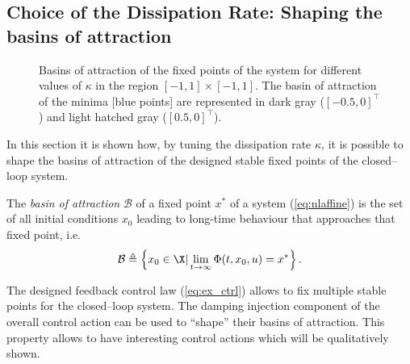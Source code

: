 \subsection{Choice of the Dissipation Rate: Shaping the basins of attraction}
%
\begin{figure*}[h]
	\centering
	\vspace{-9mm}
	\caption{\footnotesize Basins of attraction of the fixed points of the system for different values of $\kappa$ in the region $[-1,1]\times [-1,1]$. The basin of attraction of the minima [blue points] are represented in dark gray ($[-0.5,0]^\top$) and light hatched gray ($[0.5,0]^\top$).}
	\label{fig:basin}
\end{figure*}
%
In this section it is shown how, by tuning the dissipation rate $\kappa$, it is possible to shape the basins of attraction of the designed stable fixed points of the closed--loop system.
%
\begin{defn}
The \textit{basin of attraction} $\mathcal{B}$ of a fixed point $x^*$ of a system (\ref{eq:nlaffine}) is the set of all initial conditions $x_0$ leading to long-time behaviour that approaches that fixed point, i.e.
\begin{equation*}
    \mathcal{B} \triangleq \left\{x_0\in\X|\lim \limits_{t\rightarrow\infty}\Phi(t,x_0,u)=x^*\right\}.
\end{equation*}
\end{defn}
%
The designed feedback control law (\ref{eq:ex_ctrl}) allows to fix multiple stable points for the closed--loop system. The damping injection component of the overall control action can be used to ``shape'' their basins of attraction. This property allows to have interesting control actions which will be qualitatively shown.
%

